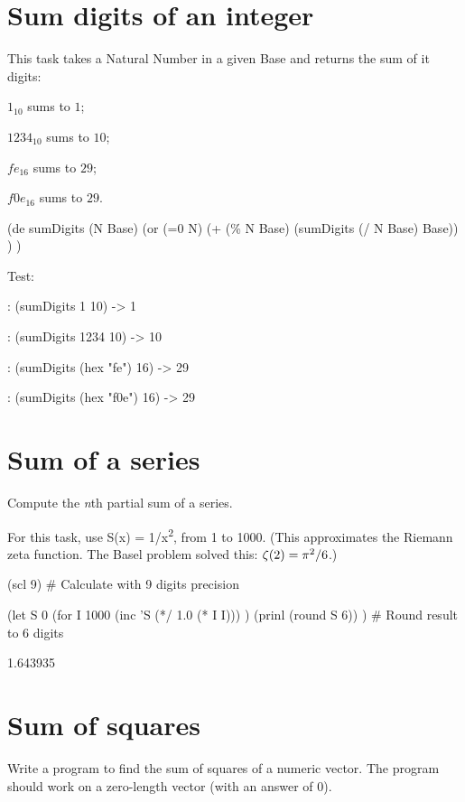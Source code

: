 \pagebreak{}
\section*{Sum digits of an integer}

This task takes a Natural Number in a given Base and returns the sum of
it digits:

$1_{10}$ sums to $1$;

$1234_{10}$ sums to $10$;

$fe_{16}$ sums to $29$;

$f0e_{16}$ sums to $29$.


\begin{wideverbatim}

(de sumDigits (N Base)
   (or
      (=0 N)
      (+ (\% N Base) (sumDigits (/ N Base) Base)) ) )

Test:

: (sumDigits 1 10)
-> 1

: (sumDigits 1234 10)
-> 10

: (sumDigits (hex "fe") 16)
-> 29

: (sumDigits (hex "f0e") 16)
-> 29

\end{wideverbatim}

\pagebreak{}
\section*{Sum of a series}

Compute the \emph{n}th partial sum of a series.

For this task, use S(x) = 1/x\textsuperscript{2}, from 1 to 1000. (This
approximates the Riemann zeta function. The Basel problem solved this:
$\zeta(2) = \pi\textsuperscript{2}/6$.)

\begin{wideverbatim}

(scl 9)  # Calculate with 9 digits precision

(let S 0
   (for I 1000
      (inc 'S (*/ 1.0 (* I I))) )
   (prinl (round S 6)) )  # Round result to 6 digits

1.643935

\end{wideverbatim}

\pagebreak{}
\section*{Sum of squares}

Write a program to find the sum of squares of a numeric vector. The
program should work on a zero-length vector (with an answer of 0).

